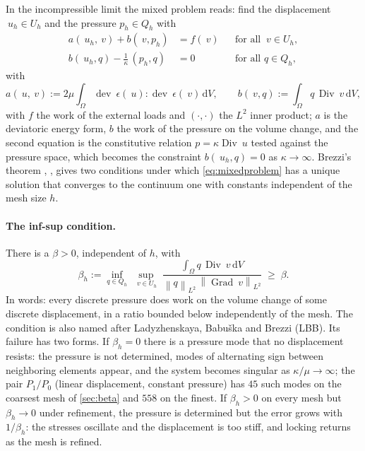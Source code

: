 \documentclass{article}
\newcommand{\eps}{~\epsilon}
\newcommand{\Grad}{\operatorname{Grad}}
\newcommand{\Div}{\operatorname{Div}}
\newcommand{\dev}{\operatorname{dev}}
\newcommand{\norm}[1]{\left\lVert #1 \right\rVert}
\newcommand{\diff}{\,\mathrm{d}}
\theoremstyle{definition}
\theoremstyle{plain}
\begin{document}
In the incompressible limit the mixed problem reads: find the displacement
$~u_h \in U_h$ and the pressure $p_h \in Q_h$ with
\begin{equation}
  \label{eq:mixedproblem}
  \begin{aligned}
    a(~u_h, ~v) + b(~v, p_h) &= f(~v) && \text{for all } ~v \in U_h, \\
    b(~u_h, q) - \tfrac{1}{\kappa}\,(p_h, q) &= 0 && \text{for all } q \in Q_h,
  \end{aligned}
\end{equation}
with
\begin{equation}
  \label{eq:forms}
  a(~u, ~v) := 2\mu \int_\Omega \dev\eps(~u) : \dev\eps(~v) \diff V,
  \qquad
  b(~v, q) := \int_\Omega q \, \Div ~v \diff V,
\end{equation}
with $f$ the work of the external loads and $(\cdot,\cdot)$ the $L^2$ inner
product; $a$ is the deviatoric energy form, $b$ the work of the pressure on
the volume change, and the second equation is the constitutive relation
$p = \kappa \Div ~u$ tested against the pressure space, which becomes the
constraint $b(~u_h, q) = 0$ as $\kappa \to \infty$. Brezzi's theorem
\cite{Brezzi:1974}, \cite[Theorem~5.2.1 and \S5.2]{BoffiBrezziFortin:2013},
gives two conditions under which \eqref{eq:mixedproblem} has a unique
solution that converges to the continuum one with constants independent of
the mesh size $h$.

\paragraph{The inf-sup condition.} There is a $\beta > 0$, independent of
$h$, with
\begin{equation}
  \label{eq:infsup-background}
  \beta_h := \inf_{q \in Q_h}\;\sup_{~v \in U_h}\;
  \frac{\displaystyle\int_\Omega q \, \Div ~v \diff V}
       {\norm{q}_{L^2}\,\norm{\Grad ~v}_{L^2}}
  \;\ge\; \beta .
\end{equation}
In words: every discrete pressure does work on the volume change of some
discrete displacement, in a ratio bounded below independently of the mesh.
The condition is also named after Ladyzhenskaya, Babu\v{s}ka and Brezzi
(LBB). Its failure has two forms. If $\beta_h = 0$ there is a pressure mode
that no displacement resists: the pressure is not determined, modes of
alternating sign between neighboring elements appear, and the system
becomes singular as $\kappa/\mu \to \infty$; the pair $P_1/P_0$ (linear
displacement, constant pressure) has $45$ such modes on the coarsest mesh
of \cref{sec:beta} and $558$ on the finest. If $\beta_h > 0$ on every mesh
but $\beta_h \to 0$ under refinement, the pressure is determined but the
error grows with $1/\beta_h$: the stresses oscillate and the displacement
is too stiff, and locking returns as the mesh is refined.
\end{document}
